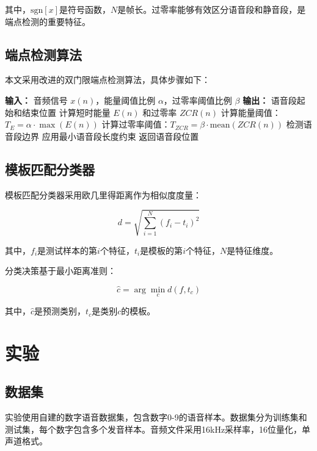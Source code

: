 \documentclass[sigconf,nonacm]{acmart}
\begin{document}
其中，$\text{sgn}[x]$是符号函数，$N$是帧长。过零率能够有效区分语音段和静音段，是端点检测的重要特征。

\subsection{端点检测算法}

本文采用改进的双门限端点检测算法，具体步骤如下：

\begin{algorithmic}
\STATE \textbf{输入：} 音频信号 $x(n)$，能量阈值比例 $\alpha$，过零率阈值比例 $\beta$
\STATE \textbf{输出：} 语音段起始和结束位置
\STATE 计算短时能量 $E(n)$ 和过零率 $ZCR(n)$
\STATE 计算能量阈值：$T_E = \alpha \cdot \max(E(n))$
\STATE 计算过零率阈值：$T_{ZCR} = \beta \cdot \text{mean}(ZCR(n))$
\STATE 检测语音段边界
\STATE 应用最小语音段长度约束
\STATE 返回语音段位置
\end{algorithmic}

\subsection{模板匹配分类器}

模板匹配分类器采用欧几里得距离作为相似度度量：

\begin{equation}
d = \sqrt{\sum_{i=1}^{N} (f_i - t_i)^2}
\end{equation}

其中，$f_i$是测试样本的第$i$个特征，$t_i$是模板的第$i$个特征，$N$是特征维度。

分类决策基于最小距离准则：

\begin{equation}
\hat{c} = \arg\min_{c} d(f, t_c)
\end{equation}

其中，$\hat{c}$是预测类别，$t_c$是类别$c$的模板。

\section{实验}

\subsection{数据集}

实验使用自建的数字语音数据集，包含数字0-9的语音样本。数据集分为训练集和测试集，每个数字包含多个发音样本。音频文件采用16kHz采样率，16位量化，单声道格式。

\end{document}
